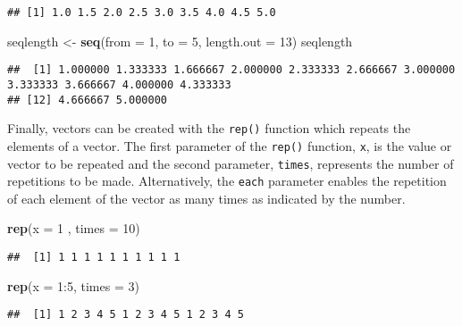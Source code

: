 \documentclass[]{book}
\newenvironment{Shaded}{\begin{snugshade}}{\end{snugshade}}
\newcommand{\KeywordTok}[1]{\textcolor[rgb]{0.13,0.29,0.53}{\textbf{{#1}}}}
\newcommand{\DataTypeTok}[1]{\textcolor[rgb]{0.13,0.29,0.53}{{#1}}}
\newcommand{\DecValTok}[1]{\textcolor[rgb]{0.00,0.00,0.81}{{#1}}}
\newcommand{\StringTok}[1]{\textcolor[rgb]{0.31,0.60,0.02}{{#1}}}
\newcommand{\NormalTok}[1]{{#1}}
\begin{document}
\begin{verbatim}
## [1] 1.0 1.5 2.0 2.5 3.0 3.5 4.0 4.5 5.0
\end{verbatim}

\begin{Shaded}
\begin{Highlighting}[]
\NormalTok{seqlength <-}\StringTok{ }\KeywordTok{seq}\NormalTok{(}\DataTypeTok{from =} \DecValTok{1}\NormalTok{, }\DataTypeTok{to =} \DecValTok{5}\NormalTok{, }\DataTypeTok{length.out =} \DecValTok{13}\NormalTok{) }
\NormalTok{seqlength}
\end{Highlighting}
\end{Shaded}

\begin{verbatim}
##  [1] 1.000000 1.333333 1.666667 2.000000 2.333333 2.666667 3.000000 3.333333 3.666667 4.000000 4.333333
## [12] 4.666667 5.000000
\end{verbatim}

Finally, vectors can be created with the \texttt{rep()} function which
repeats the elements of a vector. The first parameter of the
\texttt{rep()} function, \texttt{x}, is the value or vector to be
repeated and the second parameter, \texttt{times}, represents the number
of repetitions to be made. Alternatively, the \texttt{each} parameter
enables the repetition of each element of the vector as many times as
indicated by the number.

\begin{Shaded}
\begin{Highlighting}[]
\KeywordTok{rep}\NormalTok{(}\DataTypeTok{x =} \DecValTok{1} \NormalTok{, }\DataTypeTok{times =} \DecValTok{10}\NormalTok{)}
\end{Highlighting}
\end{Shaded}

\begin{verbatim}
##  [1] 1 1 1 1 1 1 1 1 1 1
\end{verbatim}

\begin{Shaded}
\begin{Highlighting}[]
\KeywordTok{rep}\NormalTok{(}\DataTypeTok{x =} \DecValTok{1}\NormalTok{:}\DecValTok{5}\NormalTok{, }\DataTypeTok{times =} \DecValTok{3}\NormalTok{)}
\end{Highlighting}
\end{Shaded}

\begin{verbatim}
##  [1] 1 2 3 4 5 1 2 3 4 5 1 2 3 4 5
\end{verbatim}
\end{document}

